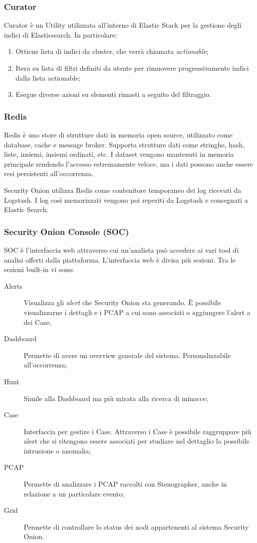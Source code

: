 \subsubsection*{Curator}
Curator \cite{curator} è un Utility utilizzata all'interno di Elastic Stack per la gestione degli indici di Elasticsearch. In particolare: 
\begin{enumerate}
    \item Ottiene lista di indici da cluster, che verrà chiamata \textit{actionable};
    \item Itera su lista di filtri definiti da utente per rimuovere progressivamente indici dalla lista actionable;
    \item Esegue diverse azioni su elementi rimasti a seguito del filtraggio.
\end{enumerate}

\subsubsection*{Redis}
Redis \cite{redis} è uno store di strutture dati in memoria open source, utilizzato come database, cache e message broker. Supporta strutture dati come stringhe, hash, liste, insiemi, insiemi ordinati, etc.
I  dataset vengono mantenuti in memoria principale rendendo l'accesso estremamente veloce, ma i dati possono anche essere resi persistenti all'occorrenza.

Security Onion utilizza Redis come contenitore temporaneo dei log ricevuti da Logstash. I log così memorizzati vengono poi reperiti da Logstash e consegnati a Elastic Search.

\subsubsection*{Security Onion Console (SOC)}
SOC è l'interfaccia web attraverso cui un'analista può accedere ai vari tool di analisi offerti dalla piattaforma.
L'interfaccia web è divisa più sezioni.
Tra le sezioni built-in vi sono:
\begin{description}
    \item[Alerts] Visualizza gli \textit{alert} che Security Onion sta generando. È possibile visualizzarne i dettagli e i PCAP a cui sono associati o aggiungere l'alert a dei Case;
    \item[Dashboard] Permette di avere un overview generale del sistema. Personalizzabile all'occorrenza;
    \item[Hunt] Simile alla Dashboard ma più mirata alla ricerca di minacce;
    \item[Case] Interfaccia per gestire i Case. Attraverso i Case è possibile raggruppare più alert che si ritengono essere associati per studiare nel dettaglio la possibile intrusione o anomalia;
    \item[PCAP] Permette di analizzare i PCAP raccolti con Stenographer, anche in relazione a un particolare evento;
    \item[Grid] Permette di controllare lo status dei nodi appartenenti al sistema Security Onion.
\end{description}


